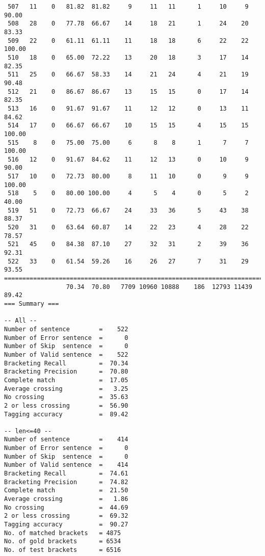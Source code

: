 \begin{verbatim}
 507   11    0   81.82  81.82     9     11   11      1     10     9    90.00
 508   28    0   77.78  66.67    14     18   21      1     24    20    83.33
 509   22    0   61.11  61.11    11     18   18      6     22    22   100.00
 510   18    0   65.00  72.22    13     20   18      3     17    14    82.35
 511   25    0   66.67  58.33    14     21   24      4     21    19    90.48
 512   21    0   86.67  86.67    13     15   15      0     17    14    82.35
 513   16    0   91.67  91.67    11     12   12      0     13    11    84.62
 514   17    0   66.67  66.67    10     15   15      4     15    15   100.00
 515    8    0   75.00  75.00     6      8    8      1      7     7   100.00
 516   12    0   91.67  84.62    11     12   13      0     10     9    90.00
 517   10    0   72.73  80.00     8     11   10      0      9     9   100.00
 518    5    0   80.00 100.00     4      5    4      0      5     2    40.00
 519   51    0   72.73  66.67    24     33   36      5     43    38    88.37
 520   31    0   63.64  60.87    14     22   23      4     28    22    78.57
 521   45    0   84.38  87.10    27     32   31      2     39    36    92.31
 522   33    0   61.54  59.26    16     26   27      7     31    29    93.55
============================================================================
                 70.34  70.80   7709 10960 10888    186  12793 11439    89.42
=== Summary ===

-- All --
Number of sentence        =    522
Number of Error sentence  =      0
Number of Skip  sentence  =      0
Number of Valid sentence  =    522
Bracketing Recall         =  70.34
Bracketing Precision      =  70.80
Complete match            =  17.05
Average crossing          =   3.25
No crossing               =  35.63
2 or less crossing        =  56.90
Tagging accuracy          =  89.42

-- len<=40 --
Number of sentence        =    414
Number of Error sentence  =      0
Number of Skip  sentence  =      0
Number of Valid sentence  =    414
Bracketing Recall         =  74.61
Bracketing Precision      =  74.82
Complete match            =  21.50
Average crossing          =   1.86
No crossing               =  44.69
2 or less crossing        =  69.32
Tagging accuracy          =  90.27
No. of matched brackets   = 4875
No. of gold brackets      = 6534
No. of test brackets      = 6516

\end{verbatim}

\normalsize

